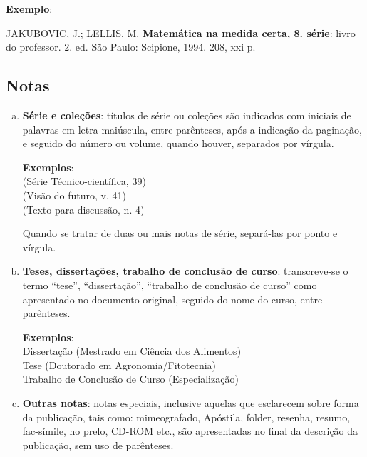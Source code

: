 \begin{exemplomanual}
\textbf{Exemplo}:\\
\begin{singlespace}
JAKUBOVIC, J.; LELLIS, M. \textbf{Matemática na medida certa, 8. série}:
livro do professor. 2. ed. São Paulo: Scipione, 1994. 208, xxi p.
\end{singlespace}
\end{exemplomanual}


\subsection{Notas}

\begin{enumerate}[a)]
  \item  \textbf{Série e coleções}: títulos de série ou coleções são indicados com iniciais de palavras em letra maiúscula, entre parênteses, após a indicação da paginação, e seguido do número ou volume, quando houver, separados por vírgula.

\begin{exemplomanuallista}
\textbf{Exemplos}:\\
(Série Técnico-científica, 39)\\
(Visão do futuro, v. 41)\\
(Texto para discussão, n. 4)
\end{exemplomanuallista}

Quando se tratar de duas ou mais notas de série, separá-las por ponto e vírgula.

  \item  \textbf{Teses, dissertações, trabalho de conclusão de curso}: transcreve-se o termo ``tese'', ``dissertação'', ``trabalho de conclusão de curso'' como apresentado no documento original, seguido do nome do curso, entre parênteses.
   
\begin{exemplomanuallista}
\textbf{Exemplos}:\\
Dissertação (Mestrado em Ciência dos Alimentos)\\
Tese (Doutorado em Agronomia/Fitotecnia)\\
Trabalho de Conclusão de Curso (Especialização)
\end{exemplomanuallista}

  \item  \textbf{Outras notas}: notas especiais, inclusive aquelas que esclarecem sobre forma da publicação, tais como: mimeografado, Apóstila, folder, resenha, resumo, fac-símile, no prelo, CD-ROM etc., são apresentadas no final da descrição da publicação, sem uso de parênteses.
\end{enumerate}



